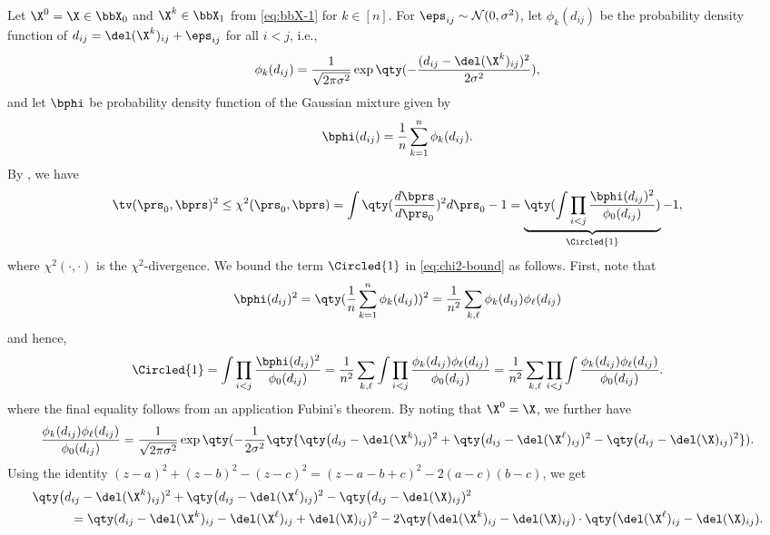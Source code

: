 \documentclass[10pt]{article}
\begin{document}
Let $\X^0 = \X \in \bbX_0$ and $\X^k \in \bbX_1$ from \cref{eq:bbX-1} for $k \in [n]$. For $\eps_{ij} \sim \mathcal{N}(0, \sigma^2)$, let $\phi_k(d_{ij})$ be the probability density function of $d_{ij} = \del(\X^k)_{ij} + \eps_{ij}$ for all $i < j$, i.e.,
\begin{align}
    \phi_k(d_{ij}) = \frac{1}{\sqrt{2\pi\sigma^2}}\exp\qty(-\frac{(d_{ij} - \del(\X^k)_{ij})^2}{2\sigma^2}),
\end{align}
and let $\bphi$ be probability density function of the Gaussian mixture given by
\begin{align}
    \bphi(d_{ij}) = \frac{1}{n}\sum_{k=1}^n \phi_k(d_{ij}).
\end{align}
By \citet[Lemma~2.7]{tsybakov2008nonparametric}, we have
\begin{align}
    \tv(\prs_0, \bprs)^2 \le \chi^2(\prs_0, \bprs) = \int \qty(\frac{d\bprs}{d\prs_0})^2 d\prs_0 - 1 = \underbrace{\qty(\int \prod_{i < j}\frac{\bphi(d_{ij})^2}{\phi_0(d_{ij})})}_{\Circled{1}} - 1,\label{eq:chi2-bound}
\end{align}
where $\chi^2(\cdot, \cdot)$ is the $\chi^2$-divergence. We bound the term $\Circled{1}$ in \cref{eq:chi2-bound} as follows. First, note that
\begin{align}
    \bphi(d_{ij})^2 = \qty(\frac{1}{n}\sum_{k=1}^n \phi_k(d_{ij}))^2 = \frac{1}{n^2}\sum_{k,\ell}\phi_k(d_{ij})\phi_\ell(d_{ij})
\end{align}
and hence,
\begin{align}
    \Circled{1} = \int \prod_{i < j}\frac{\bphi(d_{ij})^2}{\phi_0(d_{ij})} = \frac{1}{n^2}\sum_{k, \ell}\int \prod_{i < j}\frac{\phi_k(d_{ij})\phi_\ell(d_{ij})}{\phi_0(d_{ij})} = \frac{1}{n^2}\sum_{k, \ell} \prod_{i < j} \int\frac{\phi_k(d_{ij})\phi_\ell(d_{ij})}{\phi_0(d_{ij})}.\label{eq:circled-1-bound}
\end{align}
where the final equality follows from an application Fubini's theorem. By noting that $\X^0=\X$, we further have
\begin{align}
    \frac{\phi_k(d_{ij})\phi_\ell(d_{ij})}{\phi_0(d_{ij})} = \frac{1}{\sqrt{2\pi\sigma^2}}\exp\qty(-\frac{1}{2\sigma^2} \qty{ \qty\big(d_{ij} - \del(\X^k)_{ij})^2 + \qty\big(d_{ij} - \del(\X^\ell)_{ij})^2 - \qty\big(d_{ij} - \del(\X)_{ij})^2  } ).\label{eq:phi-ratio}
\end{align}
Using the identity $(z-a)^2 + (z-b)^2 - (z-c)^2 = (z - a - b + c)^2 - 2(a-c)(b-c)$, we get
\begin{align}
    & \qty\big(d_{ij} - \del(\X^k)_{ij})^2 + \qty\big(d_{ij} - \del(\X^\ell)_{ij})^2 - \qty\big(d_{ij} - \del(\X)_{ij})^2  \\ 
    &\hspace{3em} = \qty(d_{ij} - \del(\X^k)_{ij} - \del(\X^\ell)_{ij} + \del(\X)_{ij})^2 - 2\qty\big(\del(\X^k)_{ij} - \del(\X)_{ij})\cdot\qty\big(\del(\X^\ell)_{ij} - \del(\X)_{ij}).
\end{align}
\end{document}
